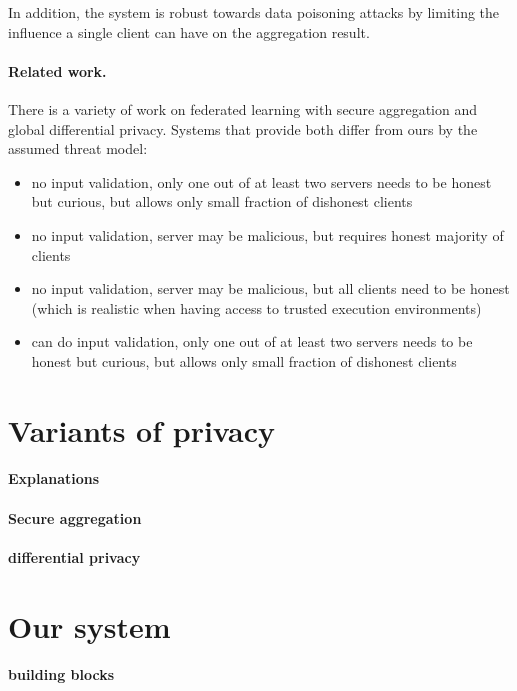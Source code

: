 \documentclass{article}
\begin{document}
In addition, the system is robust towards data poisoning attacks by limiting the influence a single client can have on the aggregation result.

\paragraph{Related work.}
There is a variety of work on federated learning with secure aggregation and global differential privacy. Systems that provide both differ from ours by the assumed threat model:
\begin{itemize}
\item\cite{dprio} no input validation, only one out of at least two servers needs to be honest but curious, but allows only small fraction of dishonest clients
\item\cite{Stevens2021EfficientDP} no input validation, server may be malicious, but requires honest majority of clients
\item\cite{Kairouz2021TheDD} no input validation, server may be malicious, but all clients need to be honest (which is realistic when having access to trusted execution environments)
\item\cite{acorn} can do input validation, only one out of at least two servers needs to be honest but curious, but allows only small fraction of dishonest clients
\end{itemize} \section{Variants of privacy}

\paragraph{Explanations}

\paragraph{Secure aggregation}

\paragraph{differential privacy}

\section{Our system}

\paragraph{building blocks}
\end{document}
